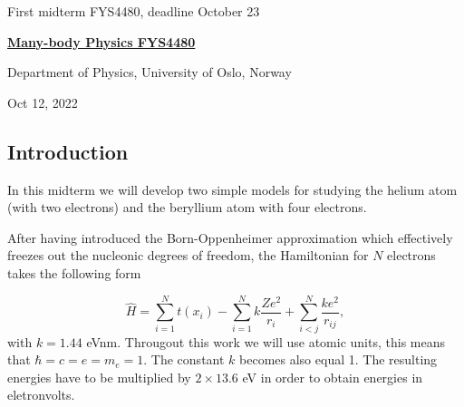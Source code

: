 \documentclass[%
oneside,                 %
final,                   %
10pt]{article}
\begin{document}

\newcommand{\exercisesection}[1]{\subsection*{#1}}






\thispagestyle{empty}

\begin{center}
{\LARGE\bf
\begin{spacing}{1.25}
First midterm FYS4480, deadline October 23
\end{spacing}
}
\end{center}


\begin{center}
{\bf \href{{http://www.uio.no/studier/emner/matnat/fys/FYS4480/index-eng.html}}{Many-body Physics FYS4480}}
\end{center}

    \begin{center}
\centerline{{\small Department of Physics, University of Oslo, Norway}}
\end{center}
    

\begin{center}
Oct 12, 2022
\end{center}

\vspace{1cm}


\subsection*{Introduction}

In this midterm we will develop two simple models for studying the 
helium atom (with two electrons) and the beryllium atom with four electrons.

After having introduced the  Born-Oppenheimer approximation which effectively freezes out the nucleonic degrees
of freedom, the Hamiltonian for $N$ electrons takes the following form

\begin{equation*}
  \hat{H} = \sum_{i=1}^{N} t(x_i) 
  - \sum_{i=1}^{N} k\frac{Ze^2}{r_i} + \sum_{i<j}^{N} \frac{ke^2}{r_{ij}},
\end{equation*}
with $k=1.44$ eVnm. Througout this work we will use atomic units, this means
that $\hbar=c=e=m_e=1$. The constant $k$ becomes also equal 1. 
The resulting energies have to be multiplied by $2\times 13.6$ eV
in order to obtain energies in eletronvolts.
\end{document}
